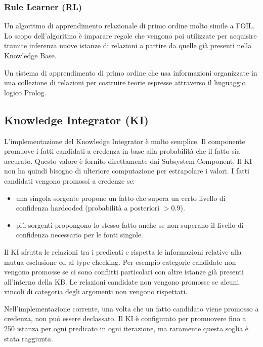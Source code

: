 \subsubsection{Rule Learner (RL)}
Un algoritmo di apprendimento relazionale di primo ordine molto simile a FOIL. Lo scopo dell'algoritmo è imparare regole che vengono poi utilizzate per acquisire tramite inferenza nuove istanze di relazioni a partire da quelle già presenti nella Knowledge Base.
\begin{info}[FOIL]
	Un sistema di apprendimento di primo ordine che usa informazioni organizzate in una collezione di relazioni per costruire teorie espresse attraverso il linguaggio logico Prolog\cite{Inductio61:online}.
\end{info}

\subsection{Knowledge Integrator (KI)}
L'implementazione del Knowledge Integrator è molto semplice. Il componente promuove i fatti candidati a credenza in base alla probabilità che il fatto sia accurato. Questo valore è fornito direttamente dai Subsystem Component. Il KI non ha quindi bisogno di ulteriore computazione per estrapolare i valori.
I fatti candidati vengono promossi a credenze se:
\begin{itemize}
	\item una singola sorgente propone un fatto che supera un certo livello di confidenza hardcoded (probabilità a posteriori $> 0.9$).
	\item più sorgenti propongono lo stesso fatto anche se non superano il livello di confidenza necessario per le fonti singole.
\end{itemize}
Il KI sfrutta le relazioni tra i predicati e rispetta le informazioni relative alla mutua esclusione ed al type checking. Per esempio categorie candidate non vengono promosse se ci sono conflitti particolari con altre istanze già presenti all'interno della KB.
Le relazioni candidate non vengono promosse se alcuni vincoli di categoria degli argomenti non vengono rispettati.

\noindent Nell'implementazione corrente, una volta che un fatto candidato viene promosso a credenza, non può essere declassato. Il KI è configurato per promuovere fino a 250 istanza per ogni predicato in ogni iterazione, ma raramente questa soglia è stata raggiunta.
\newpage